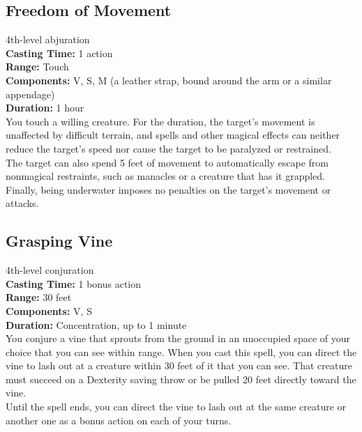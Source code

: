 \documentclass[11pt, A4paper, english]{article}
\begin{document}
		\subsection{Freedom of Movement}
4th-level abjuration \\
\textbf{Casting Time:} 1 action \\
\textbf{Range:} Touch \\
\textbf{Components:} V, S, M (a leather strap, bound around the arm or a similar appendage) \\
\textbf{Duration:} 1 hour \\
You touch a willing creature. For the duration, the target’s movement is unaffected by difficult terrain, and spells and other magical effects can neither reduce the target’s speed nor cause the target to be paralyzed or restrained. \\
The target can also spend 5 feet of movement to automatically escape from nonmagical restraints, such as manacles or a creature that has it grappled. Finally, being underwater imposes no penalties on the target's movement or attacks.

		\subsection{Grasping Vine}
4th-level conjuration \\
\textbf{Casting Time:} 1 bonus action \\
\textbf{Range:} 30 feet \\
\textbf{Components:} V, S \\
\textbf{Duration:} Concentration, up to 1 minute \\
You conjure a vine that sprouts from the ground in an unoccupied space of your choice that you can see within range. When you cast this spell, you can direct the vine to lash out at a creature within 30 feet of it that you can see. That creature must succeed on a Dexterity saving throw or be pulled 20 feet directly toward the vine. \\
Until the spell ends, you can direct the vine to lash out at the same creature or another one as a bonus action on each of your turns.
\end{document}
